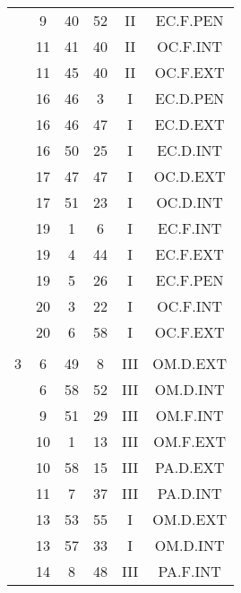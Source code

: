 \documentclass[12pt, a4paper]{article}
\begin{document}
\begin{multicols}{3}
{\begin{tabular}{c c c c c c}
	 	 	 	 & 9 & 40 & 52 & II & EC.F.PEN\\%
	 	 	 	 & 11 & 41 & 40 & II & OC.F.INT\\%
	 	 	 	 & 11 & 45 & 40 & II & OC.F.EXT\\%
	 	 	 	 & 16 & 46 & 3 & I & EC.D.PEN\\%
	 	 	 	 & 16 & 46 & 47 & I & EC.D.EXT\\%
	 	 	 	 & 16 & 50 & 25 & I & EC.D.INT\\%
	 	 	 	 & 17 & 47 & 47 & I & OC.D.EXT\\%
	 	 	 	 & 17 & 51 & 23 & I & OC.D.INT\\%
	 	 	 	 & 19 & 1 & 6 & I & EC.F.INT\\%
	 	 	 	 & 19 & 4 & 44 & I & EC.F.EXT\\%
	 	 	 	 & 19 & 5 & 26 & I & EC.F.PEN\\%
	 	 	 	 & 20 & 3 & 22 & I & OC.F.INT\\%
	 	 	 	 & 20 & 6 & 58 & I & OC.F.EXT\\%
	 	 	 	 & & & & & \\%
	 	 	 	3 & 6 & 49 & 8 & III & OM.D.EXT\\%
	 	 	 	 & 6 & 58 & 52 & III & OM.D.INT\\%
	 	 	 	 & 9 & 51 & 29 & III & OM.F.INT\\%
	 	 	 	 & 10 & 1 & 13 & III & OM.F.EXT\\%
	 	 	 	 & 10 & 58 & 15 & III & PA.D.EXT\\%
	 	 	 	 & 11 & 7 & 37 & III & PA.D.INT\\%
	 	 	 	 & 13 & 53 & 55 & I & OM.D.EXT\\%
	 	 	 	 & 13 & 57 & 33 & I & OM.D.INT\\%
	 	 	 	 & 14 & 8 & 48 & III & PA.F.INT\\%

\end{tabular}}
\end{multicols}
\end{document}
